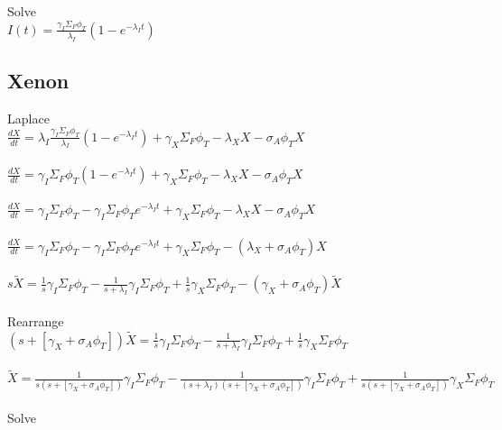 \documentclass[11pt,a4paper]{article}
\begin{document}
\noindent Solve \\
$I(t)=\frac{\gamma_I\Sigma_F\phi_T}{\lambda_I}(1-e^{-\lambda_I t})$

\subsection{Xenon}
Laplace \\
$\frac{dX}{dt}=\lambda_I \frac{\gamma_I\Sigma_F\phi_T}{\lambda_I}(1-e^{-\lambda_I t}) + \gamma_X \Sigma_F \phi_T - \lambda_X X - \sigma_A \phi_T X$ \\ \\
$\frac{dX}{dt}=\gamma_I\Sigma_F\phi_T(1-e^{-\lambda_I t}) + \gamma_X \Sigma_F \phi_T - \lambda_X X - \sigma_A \phi_T X$ \\ \\
$\frac{dX}{dt}=\gamma_I\Sigma_F\phi_T - \gamma_I\Sigma_F\phi_T e^{-\lambda_I t} + \gamma_X \Sigma_F \phi_T - \lambda_X X - \sigma_A \phi_T X$ \\ \\
$\frac{dX}{dt}=\gamma_I\Sigma_F\phi_T - \gamma_I\Sigma_F\phi_T e^{-\lambda_I t} + \gamma_X \Sigma_F \phi_T - (\lambda_X + \sigma_A \phi_T) X$ \\ \\
$s\tilde{X}=\frac{1}{s}\gamma_I\Sigma_F\phi_T - \frac{1}{s+\lambda_I}\gamma_I\Sigma_F\phi_T + \frac{1}{s}\gamma_X\Sigma_F\phi_T - (\gamma_X+\sigma_A\phi_T)\tilde{X}$ \\ \\

\noindent Rearrange \\
$(s+[\gamma_X+\sigma_A\phi_T])\tilde{X}=\frac{1}{s}\gamma_I\Sigma_F\phi_T - \frac{1}{s+\lambda_I}\gamma_I\Sigma_F\phi_T + \frac{1}{s}\gamma_X\Sigma_F\phi_T$ \\ \\
$\tilde{X}=\frac{1}{s(s+[\gamma_X+\sigma_A\phi_T])}\gamma_I\Sigma_F\phi_T - \frac{1}{(s+\lambda_I)(s+[\gamma_X+\sigma_A\phi_T])}\gamma_I\Sigma_F\phi_T + \frac{1}{s(s+[\gamma_X+\sigma_A\phi_T])}\gamma_X\Sigma_F\phi_T$ \\ \\

\noindent Solve \\
\end{document}
